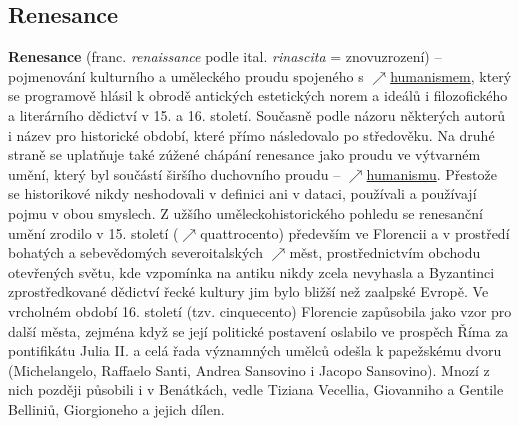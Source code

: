 \documentclass{article}
\begin{document}
  \subsection*{Renesance~\cite{Hroch:}}
  \label{sec:renesance}

  {\bf Renesance} (franc. {\it renaissance} podle ital. {\it rinascita} = znovuzrození) -- pojmenování kulturního a uměleckého proudu spojeného s $\nearrow$\hyperref[sec:humanismus]{humanismem}, který se programově hlásil k obrodě antických estetických norem a ideálů i filozofického a literárního dědictví v 15. a 16. století. Současně podle názoru některých autorů i název pro historické období, které přímo následovalo po středověku. Na druhé straně se uplatňuje také zúžené chápání renesance jako proudu ve výtvarném umění, který byl součástí širšího duchovního proudu -- $\nearrow$\hyperref[sec:humanismus]{humanismu}. Přestože se historikové nikdy neshodovali v definici ani v dataci, používali a používají pojmu v obou smyslech. Z užšího uměleckohistorického pohledu se renesanční umění zrodilo v 15. století ($\nearrow$quattrocento) především ve Florencii a v prostředí bohatých a sebevědomých severoitalských $\nearrow$měst, prostřednictvím obchodu otevřených světu, kde vzpomínka na antiku nikdy zcela nevyhasla a Byzantinci zprostředkované dědictví řecké kultury jim bylo bližší než zaalpské Evropě. Ve vrcholném období 16. století (tzv. cinquecento) Florencie zapůsobila jako vzor pro další města, zejména když se její politické postavení oslabilo ve prospěch Říma za pontifikátu Julia II. a celá řada významných umělců odešla k papežskému dvoru (Michelangelo, Raffaelo Santi, Andrea Sansovino i Jacopo Sansovino). Mnozí z nich později působili i v Benátkách, vedle Tiziana Vecellia, Giovanniho a Gentile Belliniů, Giorgioneho a jejich dílen.
\end{document}
